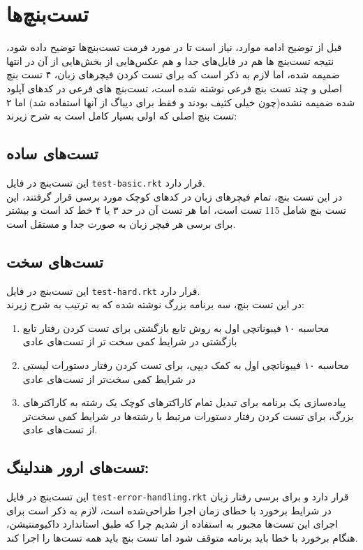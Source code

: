 \documentclass{article}
\begin{document}
\section{تست‌بنچ‌ها}
قبل از توضیح ادامه موارد، نیاز است تا در مورد فرمت تست‌بنچ‌ها توضیح داده شود، 
نتیجه تست‌بنچ ها هم در فایل‌های جدا و هم عکس‌هایی از بخش‌هایی از آن در انتها ضمیمه شده، اما لازم به ذکر است که برای تست کردن فیچر‌های زبان، 
۴ تست بنچ اصلی و چند تست بنچ فرعی نوشته شده است، 
تست‌بنچ های فرعی در کد‌های آپلود شده ضمیمه نشده(چون خیلی کثیف بودند و فقط برای دیباگ از آنها استفاده شد)
اما ۲ تست بنچ اصلی که اولی بسیار کامل است به شرح زیرند:
\subsection{تست‌های ساده}
این تست‌بنچ در فایل 
\texttt{test-basic.rkt}
قرار دارد.
\\
در این تست بنچ، تمام فیچر‌های زبان در کد‌های کوچک مورد برسی قرار گرفتند، این تست بنچ
شامل 
115
تست است، اما هر تست آن در حد ۳ یا ۴ خط کد است و بیشتر برای برسی هر فیچر زبان به صورت جدا و مستقل است.
\subsection{تست‌های سخت}
این تست‌بنچ در فایل 
\texttt{test-hard.rkt}
قرار دارد.
\\
در این تست بنچ، سه برنامه بزرگ نوشته شده که به ترتیب به شرح زیرند:
\begin{enumerate}
        \item محاسبه ۱۰ فیبوناتچی اول به روش تابع بازگشتی برای تست کردن رفتار تابع بازگشتی در شرایط کمی سخت تر از تست‌های عادی
        \item محاسبه ۱۰ فیبوناتچی اول به کمک دیپی، برای تست کردن رفتار دستورات لیستی در شرایط کمی سخت‌تر از تست‌های عادی
        \item پیاده‌سازی یک برنامه برای تبدیل تمام کاراکتر‌های کوچک یک رشته به کاراکتر‌های بزرگ، برای تست کردن رفتار دستورات مرتبط با رشته‌ها در شرایط کمی سخت‌تر از تست‌های عادی.
\end{enumerate}

\subsection{تست‌های ارور هندلینگ:}
این تست‌بنچ در فایل 
\texttt{test-error-handling.rkt}
قرار دارد و برای برسی رفتار زبان در شرایط برخورد با خطای زمان اجرا طراحی‌شده است، لازم به ذکر است برای اجرای این تست‌ها مجبور به استفاده از 
شدیم چرا که طبق استاندارد داکیومنتیشن، هنگام برخورد با خطا باید برنامه متوقف شود اما تست بنچ باید همه تست‌ها را اجرا کند.
\end{document}
